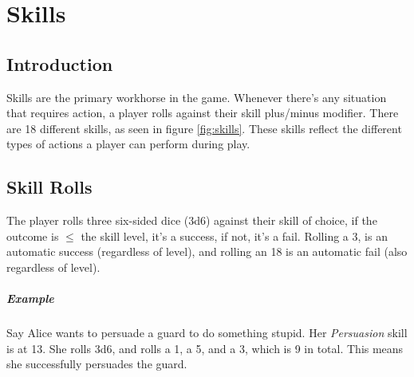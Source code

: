 \chapter{Skills} \label{chap:skills}
\section{Introduction}
Skills are the primary workhorse in the game. 
Whenever there's any situation that requires action, a player rolls against their skill plus/minus modifier. 
There are 18 different skills, as seen in figure \ref{fig:skills}. 
These skills reflect the different types of actions a player can perform during play.


\section{Skill Rolls}
The player rolls three six-sided dice (3d6) against their skill of choice, if the outcome is $\leq$ the skill level, it's a success, if not, it's a fail.
Rolling a 3, is an automatic success (regardless of level), and rolling an 18 is an automatic fail (also regardless of level).

\paragraph{Example} Say Alice wants to persuade a guard to do something stupid. Her \textit{Persuasion} skill is at 13. 
She rolls 3d6, and rolls a 1, a 5, and a 3, which is 9 in total. This means she successfully persuades the guard.

